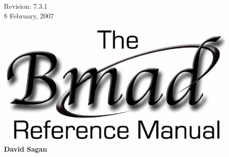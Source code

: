 \thispagestyle{empty}

\begin{flushright}
\large
  Revision: 7.3.1 \\
  8 February, 2007 \\
\end{flushright}

\vfill

{
\begin{center}
\includegraphics[width=12cm]{bmad-ref-manual.eps} \\
\vskip 0.3in
\huge\bf David Sagan
\end{center}
}

\vfill
\break
